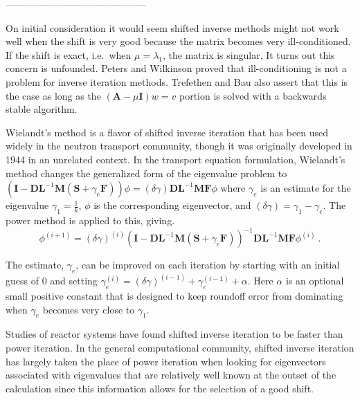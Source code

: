 \documentclass[12pt]{article}
\newcommand{\ve}[1]{\ensuremath{\mathbf{#1}}}
\begin{document}
--------------------------------------------

On initial consideration it would seem shifted inverse methods might not work well when the shift is very good because the matrix becomes very ill-conditioned. If the shift is exact, i.e.\ when $\mu = \lambda_{1}$, the matrix is singular. It turns out this concern is unfounded. Peters and Wilkinson proved that ill-conditioning is not a problem for inverse iteration methods. %
Trefethen and Bau also assert that this is the case as long as the $(\ve{A}-\mu \ve{I})w = v$ portion is solved with a backwards stable algorithm.%

Wielandt's method is a flavor of shifted inverse iteration that has been used widely in the neutron transport community, though it was originally developed in 1944 in an unrelated context. %
In the transport equation formulation, Wielandt's method changes the generalized form of the eigenvalue problem to $(\ve{I} - \ve{DL}^{-1}\ve{M}(\ve{S} +\gamma_e \ve{F}))\phi = (\delta \gamma) \ve{DL}^{-1}\ve{MF} \phi$ where $\gamma_e$ is an estimate for the eigenvalue $\gamma_1 = \frac{1}{k}$, $\phi$ is the corresponding eigenvector, and $(\delta \gamma) = \gamma_1 - \gamma_e$. The power method is applied to this, giving.%
%
\begin{equation}
\phi^{(i+1)} = (\delta \gamma)^{(i)}(\ve{I} - \ve{DL}^{-1}\ve{M}(\ve{S} +
\gamma_e \ve{F}))^{-1}\ve{DL}^{-1}\ve{MF}\phi^{(i)} \:. \label{eq:Wielandt}
\end{equation}

The estimate, $\gamma_e$, can be improved on each iteration by starting with an initial guess of $0$ and setting 
$\gamma_e^{(i)} = (\delta \gamma)^{(i-1)} + \gamma_e^{(i-1)} + \alpha$. Here $\alpha$ is an optional small positive 
constant that is designed to keep roundoff error from dominating when $\gamma_e$ becomes very close to $\gamma_1$.%

Studies of reactor systems have found shifted inverse iteration to be faster than power iteration. %
In the general computational community, shifted inverse iteration has largely taken the place of power iteration when looking for eigenvectors associated with eigenvalues that are relatively well known at the outset of the calculation since this information allows for the selection of a good shift.%
\end{document}
